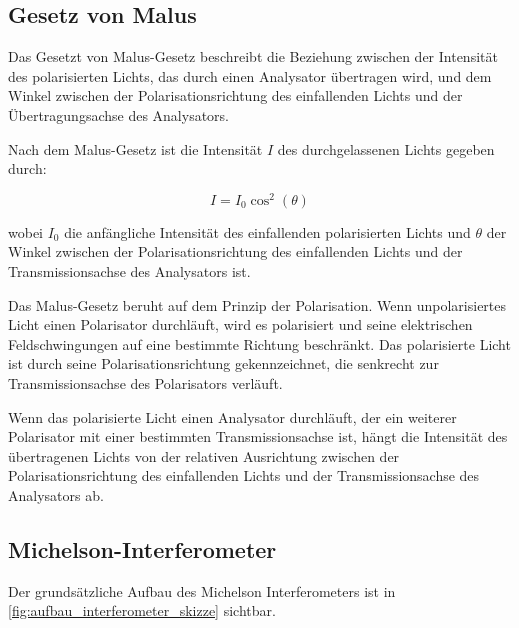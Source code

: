 \documentclass[12pt,english,ngerman]{scrartcl}
\begin{document}
\subsection{Gesetz von Malus}

Das Gesetzt von Malus-Gesetz beschreibt die Beziehung zwischen der Intensität
des polarisierten Lichts, das durch einen Analysator übertragen wird, und dem
Winkel zwischen der Polarisationsrichtung des einfallenden Lichts und der
Übertragungsachse des Analysators.

Nach dem Malus-Gesetz ist die Intensität $I$ des durchgelassenen Lichts gegeben
durch:

\begin{equation}
	I = I_0  \cos^2(\theta)
\end{equation}


wobei $I_0$ die anfängliche Intensität des einfallenden polarisierten Lichts und $\theta$
der Winkel zwischen der Polarisationsrichtung des einfallenden Lichts und der
Transmissionsachse des Analysators ist.

Das Malus-Gesetz beruht auf dem Prinzip der Polarisation. Wenn unpolarisiertes
Licht einen Polarisator durchläuft, wird es polarisiert und seine elektrischen
Feldschwingungen auf eine bestimmte Richtung beschränkt. Das polarisierte Licht
ist durch seine Polarisationsrichtung gekennzeichnet, die senkrecht zur
Transmissionsachse des Polarisators verläuft.

Wenn das polarisierte Licht einen Analysator durchläuft, der ein weiterer
Polarisator mit einer bestimmten Transmissionsachse ist, hängt die Intensität
des übertragenen Lichts von der relativen Ausrichtung zwischen der
Polarisationsrichtung des einfallenden Lichts und der Transmissionsachse des
Analysators ab.



\subsection{Michelson-Interferometer}

Der grundsätzliche Aufbau des Michelson Interferometers ist in \autoref{fig:aufbau_interferometer_skizze} sichtbar.
\end{document}

